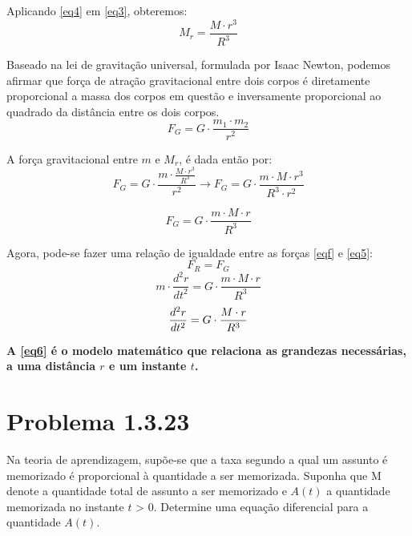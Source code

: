 \noindent Aplicando \eqref{eq4} em \eqref{eq3}, obteremos:
\begin{equation*}
M_{r}= \frac{M \cdot r^{3}}{R^{3}}
\end{equation*}

Baseado na lei de gravitação universal, formulada por Isaac Newton, podemos afirmar que força de atração gravitacional entre dois corpos é diretamente proporcional a massa dos corpos em questão e inversamente proporcional ao quadrado da distância entre os dois corpos.
\begin{equation*}
F_{G} = G \cdot \frac{m_{1} \cdot m_{2}}{r^{2}}
\end{equation*}

\noindent A força gravitacional entre $m$ e $M_{r}$, é dada então por:
\begin{equation*}
F_{G} = G \cdot \frac{m \cdot \frac{M \cdot r^{3}}{R^{3}}}{r^{2}} \rightarrow F_{G} = G \cdot \frac{m \cdot M \cdot r^{3}}{R^{3} \cdot r^{2}}
\end{equation*}

\begin{equation}\label{eq5}
F_{G} = G \cdot \frac{m \cdot M \cdot r}{R^{3}}
\end{equation}

\noindent Agora, pode-se fazer uma relação de igualdade entre as forças \eqref{eqf} e \eqref{eq5}:
\begin{equation*}
F_{R} = F_{G}
\end{equation*}
\begin{equation*}
m \cdot \frac{d^{2}r}{dt^{2}} = G \cdot \frac{m \cdot M \cdot r}{R^{3}}
\end{equation*}
\begin{equation}\label{eq6}
\boldmath
\frac{d^{2}r}{dt^{2}} = G \cdot \frac{M \cdot r}{R^{3}}
\end{equation}

\textbf{A \autoref{eq6} é o modelo matemático que relaciona as grandezas necessárias, a uma distância $r$ e um instante $t$.}

\section{Problema 1.3.23}
Na teoria de aprendizagem, supõe-se que a taxa segundo a qual um assunto é memorizado é proporcional à quantidade a ser memorizada. Suponha que M denote a quantidade total de assunto a ser memorizado e $A(t)$ a quantidade memorizada no instante $t$ > 0. Determine uma equação diferencial para a quantidade $A(t)$.

